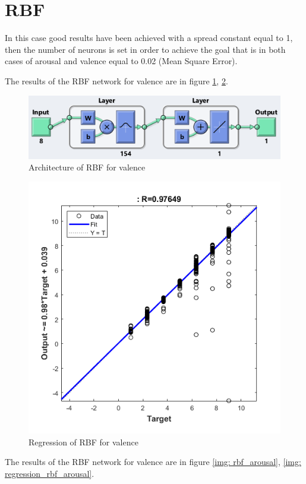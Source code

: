 \documentclass[a4paper]{report}
\begin{document}
\newpage
	\section{RBF}
	\noindent In this case good results have been achieved with a spread constant equal to 1, then the number of neurons is set in order to achieve the goal that is in both cases of arousal and valence equal to 0.02 (Mean Square Error).
	
	\noindent The results of the RBF network for valence are in figure \ref{img: rbf_valence}, \ref{img: regression_rbf_valence}.
	
	\vspace{1.5cm}
	\begin{figure}[htbp]
		\centering
		\includegraphics[scale=1]{img/rbf_valence.png}
		\caption{Architecture of RBF for valence}
		\label{img: rbf_valence}
	\end{figure}
	
	\begin{figure}[htbp]
		\centering
		\includegraphics[scale=1]{img/regression_rbf_valence.png}
		\caption{Regression of RBF for valence}
		\label{img: regression_rbf_valence}
	\end{figure}
\newpage
	\noindent The results of the RBF network for valence are in figure \ref{img: rbf_arousal}, \ref{img: regression_rbf_arousal}.
	
\end{document}

